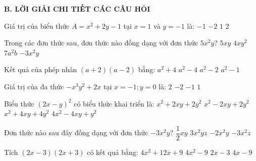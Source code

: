 \documentclass[12pt,a4paper]{article}
\begin{document}
\noindent\textbf{\large B. LỜI GIẢI CHI TIẾT CÁC CÂU HỎI}
\vspace{1mm}
\begin{ex}
Giá trị của biểu thức $A = x^2 + 2y - 1$ tại $x = 1$ và $y = -1$ là:
\choice
{$-1$}
{\True $-2$}
{$1$}
{$2$}
\end{ex}

\begin{ex}
Trong các đơn thức sau, đơn thức nào đồng dạng với đơn thức $5x^2y$?
\choice
{$5xy$}
{$4xy^2$}
{$7a^2b$}
{\True $-3x^2y$}
\end{ex}

\begin{ex}
Kết quả của phép nhân $(a + 2)(a - 2)$ bằng:
\choice
{$a^2 + 4$}
{\True $a^2 - 4$}
{$a^2 - 2$}
{$a^2 - 1$}
\end{ex}

\begin{ex}
Giá trị của đa thức $-x^3y^2 + 2x$ tại $x = -1; y = 0$ là:
\choice
{$2$}
{\True $-2$}
{$-1$}
{$1$}
\end{ex}

\begin{ex}
Biểu thức $(2x - y)^2$ có biểu thức khai triển là:
\choice
{$x^2 + 2xy + 2y^2$}
{$x^2 - 2xy + 2y^2$}
{$x^2 + 4xy + 4y^2$}
{\True $4x^2 - 4xy + y^2$}
\end{ex}

\begin{ex}
Đơn thức nào sau đây đồng dạng với đơn thức $-3x^2y$?
\choice
{$\dfrac{1}{2}xy$}
{$3x^2yz$}
{\True $-2x^2y$}
{$-3x^2z$}
\end{ex}

\begin{ex}
Tích $(2x - 3)(2x + 3)$ có kết quả bằng:
\choice
{$4x^2 + 12x + 9$}
{\True $4x^2 - 9$}
{$2x - 3$}
{$4x - 9$}
\end{ex}
\end{document}
